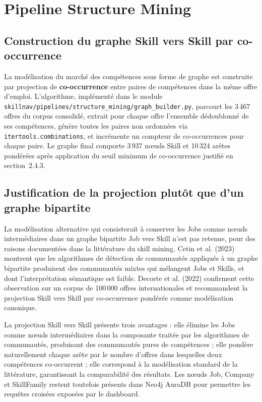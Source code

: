 \documentclass[11pt,a4paper,openany]{report}
\begin{document}
\section{Pipeline Structure Mining}

\subsection{Construction du graphe Skill vers Skill par co-occurrence}

La mod\'elisation du march\'e des comp\'etences sous forme de graphe est construite par projection de \textbf{co-occurrence} entre paires de comp\'etences dans la m\^eme offre d'emploi. L'algorithme, impl\'ement\'e dans le module \texttt{skillnav/pipelines/structure\_mining/graph\_builder.py}, parcourt les 3\,467 offres du corpus consolid\'e, extrait pour chaque offre l'ensemble d\'edoublonn\'e de ses comp\'etences, g\'en\`ere toutes les paires non ordonn\'ees via \texttt{itertools.combinations}, et incr\'emente un compteur de co-occurrences pour chaque paire. Le graphe final comporte 3\,937 n\oe uds Skill et 10\,324 ar\^etes pond\'er\'ees apr\`es application du seuil minimum de co-occurrence justifi\'e en section~2.4.3.

\subsection{Justification de la projection plut\^ot que d'un graphe bipartite}

La mod\'elisation alternative qui consisterait \`a conserver les Jobs comme n\oe uds interm\'ediaires dans un graphe bipartite Job vers Skill n'est pas retenue, pour des raisons document\'ees dans la litt\'erature du skill mining. Cetin et al. (2023) montrent que les algorithmes de d\'etection de communaut\'es appliqu\'es \`a un graphe bipartite produisent des communaut\'es mixtes qui m\'elangent Jobs et Skills, et dont l'interpr\'etation s\'emantique est faible. Decorte et al. (2022) confirment cette observation sur un corpus de 100\,000 offres internationales et recommandent la projection Skill vers Skill par co-occurrence pond\'er\'ee comme mod\'elisation canonique.

La projection Skill vers Skill pr\'esente trois avantages : elle \'elimine les Jobs comme n\oe uds interm\'ediaires dans la composante trait\'ee par les algorithmes de communaut\'es, produisant des communaut\'es pures de comp\'etences ; elle pond\`ere naturellement chaque ar\^ete par le nombre d'offres dans lesquelles deux comp\'etences co-occurrent ; elle correspond \`a la mod\'elisation standard de la litt\'erature, garantissant la comparabilit\'e des r\'esultats. Les n\oe uds Job, Company et SkillFamily restent toutefois pr\'esents dans Neo4j AuraDB pour permettre les requ\^etes crois\'ees expos\'ees par le dashboard.
\end{document}
